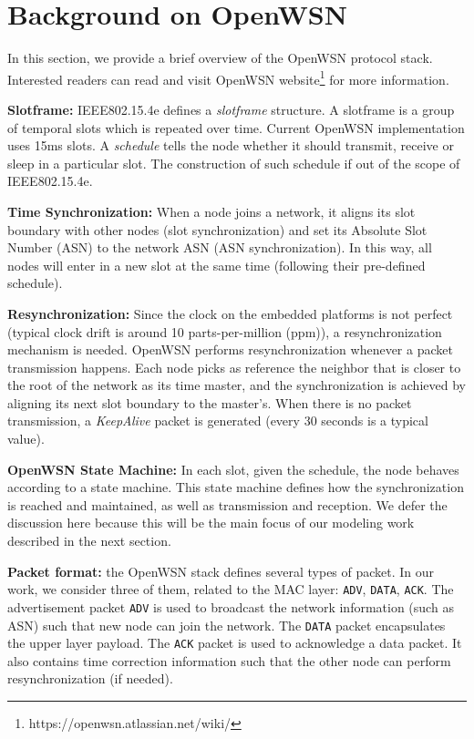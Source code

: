\section{Background on OpenWSN}
\label{sec:background-openwsn}

In this section, we provide a brief overview of the OpenWSN protocol stack. Interested readers can read \cite{watteyne2012openwsn, IEEE802.15.4e} and visit OpenWSN website\footnote{https://openwsn.atlassian.net/wiki/} for more information. 

{\bf Slotframe:} IEEE802.15.4e defines a {\em slotframe} structure. A slotframe is a group of temporal slots which is repeated over time. Current OpenWSN implementation uses 15ms slots. A {\em schedule} tells the node whether it should transmit, receive or sleep in a particular slot. The construction of such schedule if out of the scope of IEEE802.15.4e.

{\bf Time Synchronization:} When a node joins a network, it aligns its slot boundary with other nodes (slot synchronization) and set its Absolute Slot Number (ASN) to the network ASN (ASN synchronization). In this way, all nodes will enter in a new slot at the same time (following their pre-defined schedule). 

{\bf Resynchronization:} Since the clock on the embedded platforms is not perfect (typical clock drift is around 10 parts-per-million (ppm)), a resynchronization mechanism is needed. OpenWSN performs resynchronization whenever a packet transmission happens. Each node picks as reference the neighbor that is closer to the root of the network as its time master, and the synchronization is achieved by aligning its next slot boundary to the master's. When there is no packet transmission, a {\em KeepAlive} packet is generated (every 30 seconds is a typical value).

{\bf OpenWSN State Machine:} In each slot, given the schedule, the node behaves according to a state machine. This state machine defines how the synchronization is reached and maintained, as well as transmission and reception. We defer the discussion here because this will be the main focus of our modeling work described in the next section.

{\bf Packet format:} the OpenWSN stack defines several types of packet. In our work, we consider three of them, related to the MAC layer: \texttt{ADV}, \texttt{DATA}, \texttt{ACK}. The advertisement packet \texttt{ADV} is used to broadcast the network information (such as ASN) such that new node can join the network. The \texttt{DATA} packet encapsulates the upper layer payload. The \texttt{ACK} packet is used to acknowledge a data packet. It also contains time correction information such that the other node can perform resynchronization (if needed).


